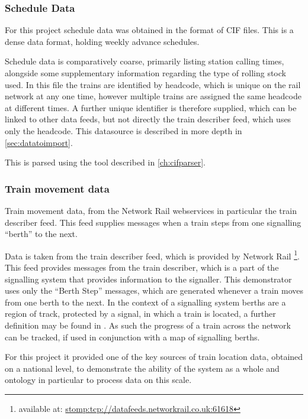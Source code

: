 \subsubsection{Schedule Data}
For this project schedule data was obtained in the format of CIF files. This is a dense data format, holding weekly advance schedules.

Schedule data is comparatively coarse, primarily listing station calling times, alongside some supplementary information regarding the type of rolling stock used. In this file the trains are identified by headcode, which is unique on the rail network at any one time, however multiple trains are assigned the same headcode at different times. A further unique identifier is therefore supplied, which can be linked to other data feeds, but not directly the train describer feed, which uses only the headcode. This datasource is described in more depth in \autoref{sec:datatoimport}.

This is parsed using the tool described in \autoref{ch:cifparser}.
   
\subsubsection{Train movement data}
Train movement data, from the Network Rail webservices in particular the train describer feed. This feed supplies messages when a train steps from one signalling ``berth'' to the next.

Data is taken from the train describer feed, which is provided by Network Rail \footnote{available at: \url{stomp:tcp://datafeeds.networkrail.co.uk:61618}}. This feed provides messages from the train describer, which is a part of the signalling system that provides information to the signaller. This demonstrator uses only the ``Berth Step'' messages, which are generated whenever a train moves from one berth to the next. In the context of a signalling system berths are a region of track, protected by a signal, in which a train is located, a further definition may be found in \citet{Woolford2004}. As such the progress of a train across the network can be tracked, if used in conjunction with a map of signalling berths.

For this project it provided one of the key sources of train location data, obtained on a national level, to demonstrate the ability of the system as a whole and ontology in particular to process data on this scale.

